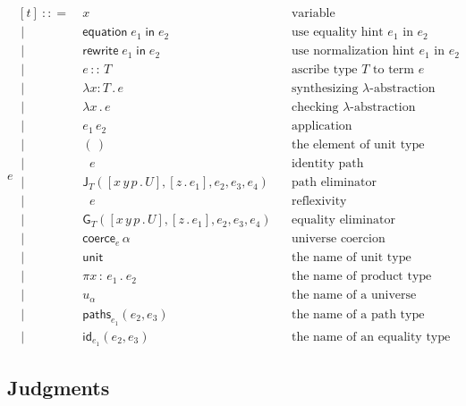 \documentclass{article}
\newcommand{\T}{T} %
\newcommand{\U}{U} %
\newcommand{\x}{x} %
\newcommand{\e}{e} %
\newcommand{\bnf}{\ \mathrel{{:}{:}{=}}\ }
\newcommand{\bnfor}{\ \mid\ \ }
\newcommand{\lam}[2]{\lambda #1 {:} #2 \,.\,} %
\newcommand{\lamx}[1]{\lambda #1 \,.\,} %
\newcommand{\app}[2]{#1\,#2} %
\newcommand{\abst}[2]{[#1 \,.\, #2]} %
\newcommand{\ascribe}[2]{#1 \,{:}{:}\, #2} %
\newcommand{\unitTerm}{(\,)} %
\newcommand{\coerce}[2]{\mathsf{coerce}_{#1} \, #2}
\newcommand{\PrElim}[6]{\mathsf{J}_{#1}(#2, #3, #4, #5, #6)} %
\newcommand{\JuElim}[6]{\mathsf{G}_{#1}(#2, #3, #4, #5, #6)} %
\newcommand{\prRefl}[1]{\mathop{\mathsf{idpath}_{#1}}}  %
\newcommand{\juRefl}[1]{\mathop{\mathsf{refl}_{#1}}}    %
\newcommand{\nUnit}{\mathsf{unit}} %
\newcommand{\nProd}[2]{\pi #1\,{:}\,#2 \,.\ } %
\newcommand{\nUniverse}[1]{u_{#1}}  %
\newcommand{\nPrEqual}[3]{\mathsf{paths}_{#1}(#2,#3)} %
\newcommand{\nJuEqual}[3]{\mathsf{id}_{#1}(#2,#3)} %
\newcommand{\equationin}[1]{\mathsf{equation}\; #1 \; \mathsf{in} \;} %
\newcommand{\rewritein}[1]{\mathsf{rewrite}\; #1 \; \mathsf{in} \;} %
\begin{document}
\begin{equation*}
  \e
  \begin{aligned}[t]
    \bnf   {}&  \x   &&\text{variable} \\
    \bnfor {}&  \equationin{\e_1} e_2 &&\text{use equality hint $\e_1$ in $\e_2$} \\
    \bnfor {}&  \rewritein{\e_1} e_2 &&\text{use normalization hint $\e_1$ in $\e_2$} \\
    \bnfor {}&  \ascribe{\e}{\T}  &&\text{ascribe type $\T$ to term $\e$} \\
    \bnfor {}&  \lam{\x}{\T} \e  &&\text{synthesizing $\lambda$-abstraction} \\
    \bnfor {}&  \lamx{\x} \e  &&\text{checking $\lambda$-abstraction} \\
    \bnfor {}&  \app{\e_1}{\e_2}  &&\text{application} \\
    \bnfor {}&  \unitTerm  &&\text{the element of unit type} \\
    \bnfor {}&  \prRefl{\T}{\e}  &&\text{identity path} \\
    \bnfor {}&  \PrElim{\T}{\abst{x\,y\,p}{\U}}{\abst{z}{\e_1}}{\e_2}{\e_3}{\e_4}  &&\text{path eliminator} \\
    \bnfor {}&  \juRefl{\T}{\e}  &&\text{reflexivity} \\
    \bnfor {}&  \JuElim{\T}{\abst{x\,y\,p}{\U}}{\abst{z}{\e_1}}{\e_2}{\e_3}{\e_4}  &&\text{equality eliminator} \\
    \bnfor {}&  \coerce{\e}{\alpha}  &&\text{universe coercion} \\
    \bnfor {}&  \nUnit  &&\text{the name of unit type} \\
    \bnfor {}&  \nProd{\x}{\e_1} \e_2  &&\text{the name of product type} \\
    \bnfor {}&  \nUniverse{\alpha} &&\text{the name of a universe} \\
    \bnfor {}&  \nPrEqual{\e_1}{\e_2}{\e_3}  &&\text{the name of a path type} \\
    \bnfor {}&  \nJuEqual{\e_1}{\e_2}{\e_3}  &&\text{the name of an equality type}
  \end{aligned}
\end{equation*}

\subsection{Judgments}
\label{sec:bidirectional-judgments}
\end{document}
